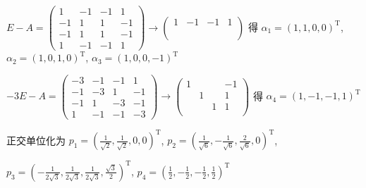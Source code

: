 \begin{enumerate}
			       \( E-A = \begin{pmatrix}
				       1  & -1 & -1 & 1  \\
				       -1 & 1  & 1  & -1 \\
				       -1 & 1  & 1  & -1 \\
				       1  & -1 & -1 & 1
			       \end{pmatrix} \rightarrow \begin{pmatrix}
				       1 & -1 & -1 & 1 \\
				         &    &    &   \\
				         &    &    &   \\
				         &    &    &
			       \end{pmatrix} \) 得 \( \alpha_{1} = (1, 1, 0, 0)^{\mathrm{T}} \), \( \alpha_{2} = (1, 0, 1, 0)^{\mathrm{T}} \), \( \alpha_{3} = (1, 0, 0, -1)^{\mathrm{T}} \)

			       \( -3E-A = \begin{pmatrix}
				       -3 & -1 & -1 & 1  \\
				       -1 & -3 & 1  & -1 \\
				       -1 & 1  & -3 & -1 \\
				       1  & -1 & -1 & -3
			       \end{pmatrix} \rightarrow \begin{pmatrix}
				       1 &   &   & -1 \\
				         & 1 &   & 1  \\
				         &   & 1 & 1  \\
				         &   &   &
			       \end{pmatrix} \) 得 \( \alpha_{4} = (1, -1, -1, 1)^{\mathrm{T}} \)

			       正交单位化为 \( p_{1} = \left( \frac{1}{\sqrt{2}}, \frac{1}{\sqrt{2}}, 0, 0 \right)^{\mathrm{T}} \), \( p_{2} = \left( \frac{1}{\sqrt{6}}, -\frac{1}{\sqrt{6}}, \frac{2}{\sqrt{6}}, 0 \right)^{\mathrm{T}} \),

			       \( p_{3} = \left( -\frac{1}{2\sqrt{3}}, \frac{1}{2\sqrt{3}}, \frac{1}{2\sqrt{3}}, \frac{\sqrt{3}}{2} \right)^{\mathrm{T}} \), \( p_{4} = \left( \frac{1}{2}, -\frac{1}{2}, -\frac{1}{2}, \frac{1}{2} \right)^{\mathrm{T}} \)


\end{enumerate}
